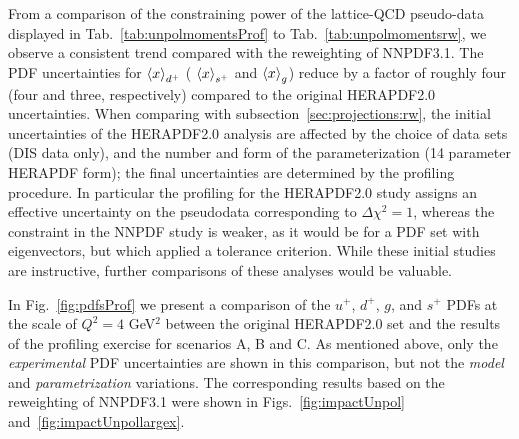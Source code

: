 From a comparison of the constraining power of the lattice-QCD pseudo-data  displayed in 
Tab.~\ref{tab:unpolmomentsProf} to Tab.~\ref{tab:unpolmomentsrw},
we observe a consistent trend compared with the reweighting of NNPDF3.1.
%
The   PDF uncertainties for $\left\langle x\right\rangle_{d^+}$ ( $\left\langle x\right\rangle_{s^+}$
and  $\left\langle x\right\rangle_g$)  reduce by a factor of roughly
four (four and three, respectively) compared to the original
HERAPDF2.0 uncertainties.
%
When comparing  with  subsection~\ref{sec:projections:rw},
the initial uncertainties of the HERAPDF2.0  analysis 
are affected by the choice of data sets (DIS data only), and 
the number and form of the parameterization (14 parameter HERAPDF form);
the final uncertainties are determined by the profiling procedure. 
In particular the profiling for the HERAPDF2.0 study assigns an effective 
uncertainty on the pseudodata corresponding to $\Delta\chi^2=1$, whereas the 
constraint in the NNPDF study is weaker, as it would be for a PDF set with eigenvectors, but which applied a tolerance criterion. 
%
While these initial studies are instructive, 
further comparisons of these analyses would be valuable. 



In Fig.~\ref{fig:pdfsProf} we present a
comparison of the
$u^+$, $d^+$, $g$, and $s^+$ PDFs at the scale of $Q^2=4$ GeV$^2$
between the original  HERAPDF2.0 set and the results of the profiling
exercise for scenarios A, B and C.
%
As mentioned above, only the {\it experimental} PDF uncertainties are shown
in this comparison,
but not the {\it model} and {\it parametrization} variations.
%
The corresponding results based on the reweighting
of NNPDF3.1 were shown in Figs.~\ref{fig:impactUnpol}
and~\ref{fig:impactUnpollargex}.

